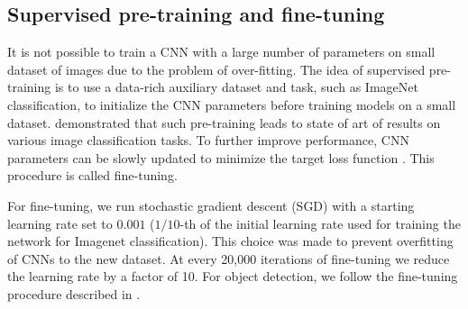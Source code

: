 \subsection{Supervised pre-training and fine-tuning}
\label{sub:fine-train}
It is not possible to train a CNN with a large number of parameters on small dataset of images due to the problem of over-fitting. The idea of supervised pre-training is to use a data-rich auxiliary dataset and task, such as ImageNet classification, to initialize the CNN parameters before training models on a small dataset. \cite{Decaf} demonstrated that such pre-training leads to state of art of results on various image classification tasks. To further improve performance, CNN parameters can be slowly updated to minimize the target loss function \cite{Rcnn}. This procedure is called fine-tuning.   


For fine-tuning, we run stochastic gradient descent (SGD) with a starting learning rate set to $0.001$ ($1/10$-th of the initial learning rate used for training the network for Imagenet classification). 
This choice was made to prevent overfitting of CNNs to the new dataset.
At every 20,000 iterations of fine-tuning we reduce the learning rate by a factor of 10.
For object detection, we follow the fine-tuning procedure described in \cite{Rcnn}.

